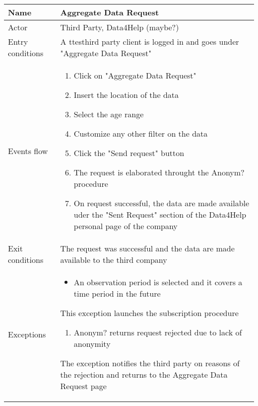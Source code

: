 \begin{table}[]
\begin{tabular}{|l|p{12cm}|}
\hline
Name             & Aggregate Data Request \\ \hline
Actor            & Third Party, Data4Help (maybe?) \\ \hline
Entry conditions & A ttesthird party client is logged in and goes under "Aggregate Data Request" \\ \hline
Events flow      & \begin{enumerate}
\item Click on "Aggregate Data Request"
\item Insert the location of the data
\item Select the age range
\item Customize any other filter on the data
\item Click the "Send request" button
\item The request is elaborated throught the Anonym? procedure
\item On request successful, the data are made available uder the "Sent Request" section of the Data4Help personal page of the company
\end{enumerate} \\ \hline
Exit conditions  & The request was successful and the data are made available to the third company \\ \hline
Exceptions       & \begin{itemize}
\item An observation period is selected and it covers a time period in the future
\end{itemize} This exception launches the subscription procedure
\begin{enumerate}
\item Anonym? returns request rejected due to lack of anonymity
\end{enumerate} The exception notifies the third party on reasons of the rejection and returns to the Aggregate Data Request page\\ \hline
\end{tabular}
\end{table}

